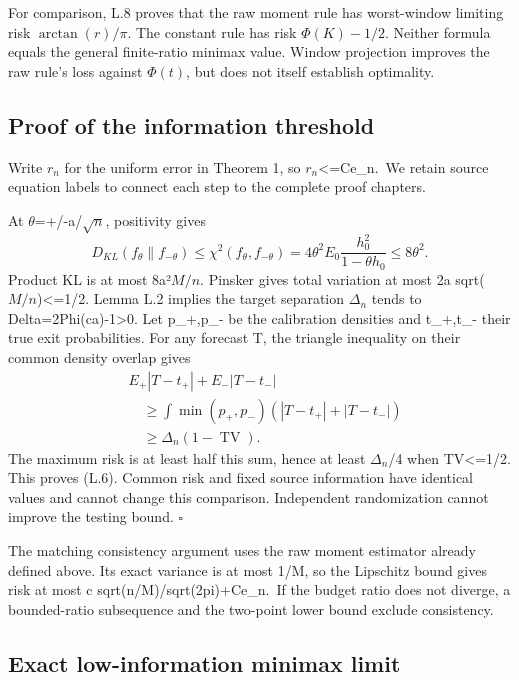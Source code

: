 For comparison, L.8 proves that the raw moment rule has worst-window limiting risk \(\arctan(r)/\pi\). The constant rule has risk \(\Phi(K)-1/2\). Neither formula equals the general finite-ratio minimax value. Window projection improves the raw rule's loss against \(\Phi(t)\), but does not itself establish optimality.

\subsection{Proof of the information threshold}\label{proof-of-the-information-threshold}

Write \(r_n\) for the uniform error in Theorem 1, so \(r_n\)\textless=Ce\_n.~We retain source equation labels to connect each step to the complete proof chapters.

At \(\theta\)=+/-a/\(\sqrt n\), positivity gives
\[
D_{KL}(f_\theta\|f_{-\theta})\le\chi^2(f_\theta,f_{-\theta})
=4\theta^2 E_0\frac{h_0^2}{1-\theta h_0}\le8\theta^2.
\]
Product KL is at most 8a²\(M/n\). Pinsker gives total variation at most 2a sqrt(\(M/n\))\textless=1/2. Lemma L.2 implies the target separation \(\Delta_n\) tends to Delta=2Phi(ca)-1\textgreater0. Let p\_+,p\_- be the calibration densities and t\_+,t\_- their true exit probabilities. For any forecast T, the triangle inequality on their common density overlap gives
\[
\begin{aligned}
&E_+|T-t_+|+E_-|T-t_-|\\
&\quad\ge\int\min(p_+,p_-)(|T-t_+|+|T-t_-|)\\
&\quad\ge\Delta_n(1-\operatorname{TV}).
\end{aligned}
\]
The maximum risk is at least half this sum, hence at least \(\Delta_n\)/4 when TV\textless=1/2. This proves (L.6). Common risk and fixed source information have identical values and cannot change this comparison. Independent randomization cannot improve the testing bound. \(\square\)

The matching consistency argument uses the raw moment estimator already defined above. Its exact variance is at most 1/M, so the Lipschitz bound gives risk at most c sqrt(n/M)/sqrt(2pi)+Ce\_n.~If the budget ratio does not diverge, a bounded-ratio subsequence and the two-point lower bound exclude consistency.

\subsection{Exact low-information minimax limit}\label{exact-low-information-minimax-limit}

